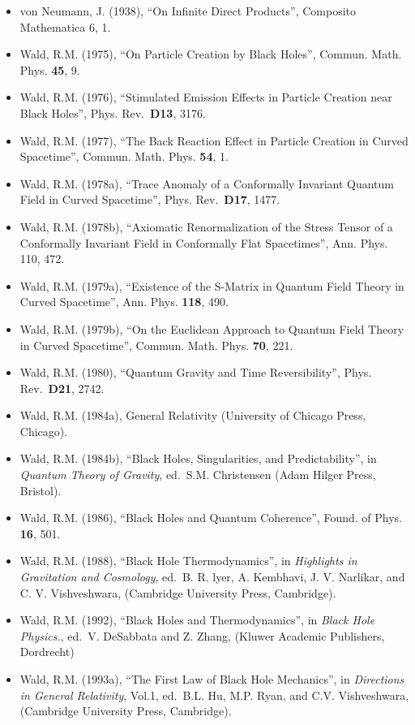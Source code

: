 \documentclass[11pt,a4paper]{article}
\providecommand{\tightlist}{\setlength{\itemsep}{0pt}\setlength{\parskip}{0pt}}
\begin{document}
\begin{itemize}
\tightlist
\item
  von Neumann, J. (1938), ``On Infinite Direct Products'', Composito Mathematica 6, 1.
\item
  Wald, R.M. (1975), ``On Particle Creation by Black Holes'', Commun. Math. Phys. \textbf{45}, 9.
\item
  Wald, R.M. (1976), ``Stimulated Emission Effects in Particle Creation near Black Holes'', Phys. Rev.~\textbf{D13}, 3176.
\item
  Wald, R.M. (1977), ``The Back Reaction Effect in Particle Creation in Curved Spacetime'', Commun. Math. Phys. \textbf{54}, 1.
\item
  Wald, R.M. (1978a), ``Trace Anomaly of a Conformally Invariant Quantum Field in Curved Spacetime'', Phys. Rev.~\textbf{D17}, 1477.
\item
  Wald, R.M. (1978b), ``Axiomatic Renormalization of the Stress Tensor of a Conformally Invariant Field in Conformally Flat Spacetimes'', Ann. Phys. 110, 472.
\item
  Wald, R.M. (1979a), ``Existence of the S-Matrix in Quantum Field Theory in Curved Spacetime'', Ann. Phys. \textbf{118}, 490.
\item
  Wald, R.M. (1979b), ``On the Euclidean Approach to Quantum Field Theory in Curved Spacetime'', Commun. Math. Phys. \textbf{70}, 221.
\item
  Wald, R.M. (1980), ``Quantum Gravity and Time Reversibility'', Phys. Rev.~\textbf{D21}, 2742.
\item
  Wald, R.M. (1984a), General Relativity (University of Chicago Press, Chicago).
\item
  Wald, R.M. (1984b), ``Black Holes, Singularities, and Predictability'', in \emph{Quantum Theory of Gravity}, ed.~S.M. Christensen (Adam Hilger Press, Bristol).
\item
  Wald, R.M. (1986), ``Black Holes and Quantum Coherence'', Found. of Phys. \textbf{16}, 501.
\item
  Wald, R.M. (1988), ``Black Hole Thermodynamics'', in \emph{Highlights in Gravitation and Cosmology}, ed.~B. R. lyer, A. Kembhavi, J. V. Narlikar, and C. V. Vishveshwara, (Cambridge University Press, Cambridge).
\item
  Wald, R.M. (1992), ``Black Holes and Thermodynamics'', in \emph{Black Hole Physics.}, ed.~V. DeSabbata and Z. Zhang, (Kluwer Academic Publishers, Dordrecht)
\item
  Wald, R.M. (1993a), ``The First Law of Black Hole Mechanics'', in \emph{Directions in General Relativity}, Vol.1, ed.~B.L. Hu, M.P. Ryan, and C.V. Vishveshwara, (Cambridge University Press, Cambridge).

\end{itemize}
\end{document}
